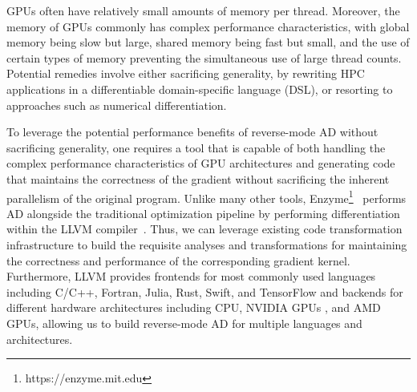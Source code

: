 GPUs often have relatively small amounts of memory per thread. Moreover, the memory of GPUs commonly has complex performance characteristics, with global memory being slow but large, shared memory being fast but small, 
and the use of certain types of memory preventing the simultaneous use of large thread counts. Potential remedies involve either sacrificing generality, by rewriting HPC applications in a differentiable domain-specific language (DSL), or resorting  to  approaches such as numerical differentiation. 


To leverage the potential performance benefits of reverse-mode AD without sacrificing generality, one requires a tool that is  capable of both  handling the complex performance characteristics of GPU architectures and generating code that maintains the correctness of the gradient without sacrificing the inherent parallelism of the original program. 
Unlike many other tools, Enzyme\footnote{https://enzyme.mit.edu}~\cite{enzymeNeurips} performs AD alongside the traditional optimization pipeline by performing differentiation within the LLVM compiler~\cite{LLVM}. Thus,  we  can leverage existing code transformation infrastructure to build the requisite analyses and transformations for maintaining the correctness and performance of the corresponding gradient kernel. Furthermore, LLVM provides frontends for most commonly used languages including C/C++, Fortran, Julia, Rust, Swift, and TensorFlow and backends for different hardware architectures including CPU, NVIDIA GPUs \cite{rhodin2010ptx,holewinski2011ptx, gpucc}, and AMD GPUs, allowing us to build reverse-mode AD for multiple languages and architectures.

